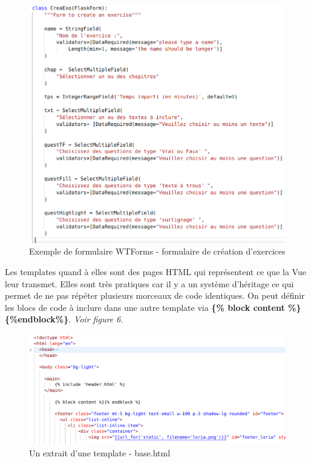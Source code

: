 \documentclass[12pt]{article}
\begin{document}
\begin{figure}[h]
    \centering
    \includegraphics[scale=0.3]{ex_wtforms.png}
    \caption{Exemple de formulaire WTForms - formulaire de création d'exercices}
    \label{fig:ex_wtforms}
\end{figure}

\clearpage

Les templates quand à elles sont des pages HTML qui représentent ce que la Vue leur transmet. Elles sont très pratiques car il y a un système d'héritage ce qui permet de ne pas répéter plusieurs morceaux de code identiques. On peut définir les blocs de code à inclure dans une autre template via \textbf{ \{\% block content \%\} \{\%endblock\%\}}. \textit{Voir figure 6}. 

\begin{figure}[h]
    \centering
    \includegraphics[scale=0.3]{ex_block_base.png}
    \caption{Un extrait d'une template - base.html}
    \label{fig:ex_temp}
\end{figure}
\end{document}
